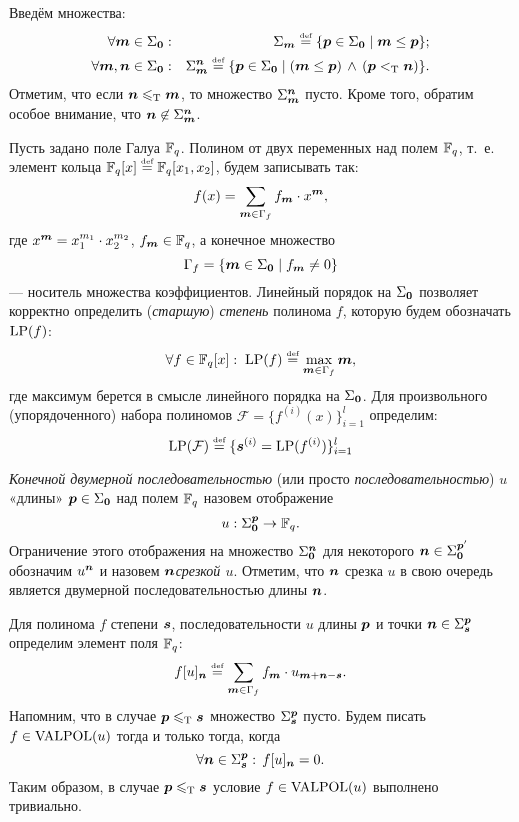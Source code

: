 \documentclass[14pt]{extarticle}
\begin{document}
Введём  множества:
\begin{eqnarray*}
   \forall \boldsymbol{m} \in \Sigma_{\boldsymbol{0}}:& &\Sigma_{\boldsymbol{m}}
      \stackrel{\text{\tiny def}}{=}\{\boldsymbol{p} \in \Sigma_{\boldsymbol{0}}\mid\boldsymbol{m} \le \boldsymbol{p}\};\\
   \forall \boldsymbol{m}, \boldsymbol{n} \in \Sigma_{\boldsymbol{0}}:& &\Sigma_{\boldsymbol{m}}^{\boldsymbol{n}}
      \stackrel{\text{\tiny def}}{=}\{\boldsymbol{p} \in \Sigma_{\boldsymbol{0}}\mid(\boldsymbol{m} \le \boldsymbol{p})\,\wedge\,(\boldsymbol{p}<_{\textrm T} \boldsymbol{n})\}.
\end{eqnarray*}
Отметим, что если $\boldsymbol{n} \leqslant_{\textrm T} \boldsymbol{m}$, то множество $\Sigma_{\boldsymbol{m}}^{\boldsymbol{n}}$
пусто. Кроме того, обратим особое внимание, что
   $\boldsymbol{n} \not \in \Sigma_{\boldsymbol{m}}^{\boldsymbol{n}}$.

Пусть задано поле Галуа $\mathbb F_q$. Полином от двух переменных над полем $\mathbb F_q$,
т.~е. элемент кольца ${\mathbb F_q[x]\stackrel{\text{\tiny def}}{=}\mathbb F_q[x_1,x_2]}$, будем записывать так:
$$f(x)=\sum_{\boldsymbol{m} \in \Gamma_f}f_{\boldsymbol{m}}\cdot x^{\boldsymbol{m}},$$
где $x^{\boldsymbol{m}}={x_1^{m_1}\cdot x_2^{m_2}}$, $f_{\boldsymbol{m}} \in \mathbb F_q$, а
конечное множество $$\Gamma_f=\{\boldsymbol{m} \in\Sigma_{\boldsymbol{0}}\mid f_{\boldsymbol{m}}\ne0\}$$ ---
носитель множества коэффициентов. Линейный порядок на $\Sigma_{\boldsymbol{0}}$ позволяет
корректно определить (\emph{старшую}) \emph{степень} полинома $f$, которую будем
обозначать $\operatorname{LP}(f)$:
$$ \forall f \in \mathbb F_q[x]:\;\operatorname{LP}(f)\stackrel{\text{\tiny def}}{=}\max_{\boldsymbol{m} \in \Gamma_f}\boldsymbol{m}, $$
где максимум берется в смысле линейного порядка на $\Sigma_{\boldsymbol{0}}$. Для
произвольного (упорядоченного) набора полиномов
$\mathcal{F}=\{f^{(i)}(x)\}_{i=1}^l$ определим:
$$ \operatorname{LP}(\mathcal F) \stackrel{\text{\tiny def}}{=} \{\boldsymbol{s}^{(i)} = \operatorname{LP}(f^{(i)})\}_{i=1}^l $$

{\em Конечной двумерной последовательностью\/} (или просто {\em
последовательностью\/}) $u$ «длины» $\boldsymbol{p} \in \Sigma_{\boldsymbol{0}}$ над полем
$\mathbb F_q$ назовем отображение $$u:\Sigma_{\boldsymbol{0}}^{\boldsymbol{p}}\to\mathbb F_q.$$
Ограничение этого отображения на множество $\Sigma_{\boldsymbol{0}}^{\boldsymbol{n}}$ для
некоторого $\boldsymbol{n} \in\Sigma_{\boldsymbol{0}}^{\boldsymbol{p}'}$ обозначим $u^{\boldsymbol{n}}$ и
назовем {\em$\boldsymbol{n}$\nbdash срезкой $u$}. Отметим, что $\boldsymbol{n}$\nbdash
срезка $u$ в свою очередь является двумерной последовательностью
длины $\boldsymbol{n}$.

Для полинома $f$ степени $\boldsymbol{s}$, последовательности $u$ длины $\boldsymbol{p}$ и точки
$\boldsymbol{n}\in\Sigma_{\boldsymbol{s}}^{\boldsymbol{p}}$ определим элемент поля $\mathbb F_q$:
\begin{equation}\label{polyseqprod}
   f[u]_{\boldsymbol{n}}\stackrel{\text{\tiny def}}{=}
      \sum_{\boldsymbol{m} \in \Gamma_f}f_{\boldsymbol{m}}\cdot u_{\boldsymbol{m} + \boldsymbol{n} - \boldsymbol{s}}.
\end{equation}
Напомним, что в случае $\boldsymbol{p}\leqslant_{\textrm T} \boldsymbol{s}$ множество $\Sigma_{\boldsymbol{s}}^{\boldsymbol{p}}$ пусто. Будем писать $f \in \operatorname{VALPOL}(u)$ тогда и только тогда,
когда
\begin{equation}\label{Conv}
   \forall\boldsymbol{n}\in\Sigma_{\boldsymbol{s}}^{\boldsymbol{p}}:\,f[u]_{\boldsymbol{n}}=0.
\end{equation}
Таким образом, в случае $\boldsymbol{p} \leqslant_{\textrm T} \boldsymbol{s}$ условие $f \in \operatorname{VALPOL}(u)$ выполнено
тривиально.
\end{document}
